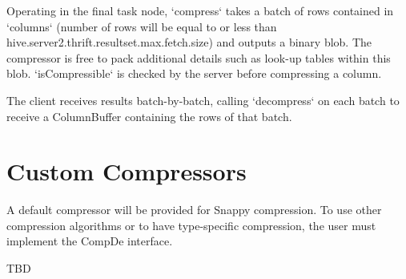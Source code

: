 \documentclass[11pt,a4paper]{article}
\begin{document}
		Operating in the final task node, `compress` takes a batch of rows contained in `columns` (number of rows will be equal to or less than \linebreak hive.server2.thrift.resultset.max.fetch.size) and outputs a binary blob.
		The compressor is free to pack additional details such as look-up tables within this blob.
		`isCompressible` is checked by the server before compressing a column.
		
		The client receives results batch-by-batch, calling `decompress` on each batch to receive a ColumnBuffer containing the rows of that batch.
			
\section{Custom Compressors}
		A default compressor will be provided for Snappy compression.
		To use other compression algorithms or to have type-specific compression, the user must implement the CompDe interface.
		
		TBD
		
\end{document}

